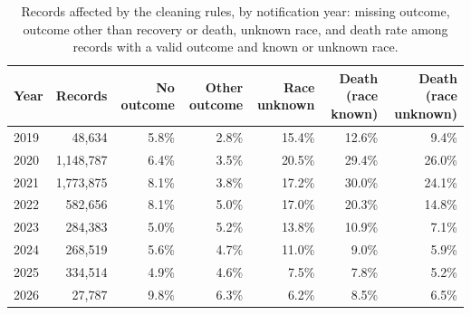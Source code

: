 \begin{table}
  \small
  \caption{Records affected by the cleaning rules, by notification year: missing outcome, outcome other than recovery or death, unknown race, and death rate among records with a valid outcome and known or unknown race.}
  \label{tab:selection-by-year}
  \begin{tabular}{lrrrrrr}
    \toprule
    Year & Records & No outcome & Other outcome & Race unknown & Death (race known) & Death (race unknown) \\
    \midrule
    2019 & 48,634 & 5.8\% & 2.8\% & 15.4\% & 12.6\% & 9.4\% \\
    2020 & 1,148,787 & 6.4\% & 3.5\% & 20.5\% & 29.4\% & 26.0\% \\
    2021 & 1,773,875 & 8.1\% & 3.8\% & 17.2\% & 30.0\% & 24.1\% \\
    2022 & 582,656 & 8.1\% & 5.0\% & 17.0\% & 20.3\% & 14.8\% \\
    2023 & 284,383 & 5.0\% & 5.2\% & 13.8\% & 10.9\% & 7.1\% \\
    2024 & 268,519 & 5.6\% & 4.7\% & 11.0\% & 9.0\% & 5.9\% \\
    2025 & 334,514 & 4.9\% & 4.6\% & 7.5\% & 7.8\% & 5.2\% \\
    2026 & 27,787 & 9.8\% & 6.3\% & 6.2\% & 8.5\% & 6.5\% \\
    \bottomrule
  \end{tabular}
\end{table}
